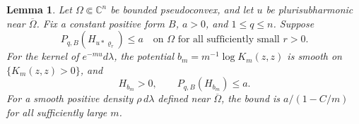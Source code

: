 \documentclass[10pt,a4paper]{amsart}
\newtheorem{lemma}[theorem]{Lemma}
\begin{document}
\begin{lemma}\label{lem:bergman-trace}
Let $\Omega\Subset\mathbb C^n$ be bounded pseudoconvex, and let $u$ be plurisubharmonic near $\overline\Omega$. Fix a constant positive form $B$, $a>0$, and $1\le q\le n$. Suppose
\begin{equation}\label{eq:bergman-full}
 P_{q,B}(H_{u*\varrho_r})\le a
 \quad\text{on }\Omega\text{ for all sufficiently small }r>0.
\end{equation}
For the kernel of $e^{-mu}d\lambda$, the potential $b_m=m^{-1}\log K_m(z,z)$ is smooth on $\{K_m(z,z)>0\}$, and
\begin{equation}\label{eq:bergman-partial}
 H_{b_m}>0,\qquad P_{q,B}(H_{b_m})\le a.
\end{equation}
For a smooth positive density $\rho\,d\lambda$ defined near $\overline\Omega$, the bound is $a/(1-C/m)$ for all sufficiently large $m$.
\end{lemma}
\end{document}
